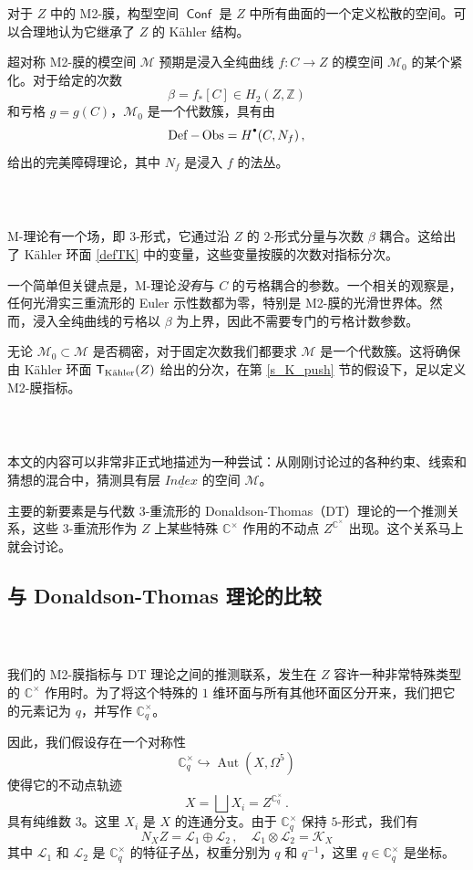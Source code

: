 \documentclass[12pt]{article}
\newcommand{\C}{\mathbb{C}}
\newcommand{\Z}{\mathbb{Z}}
\newcommand{\cL}{\mathscr{L}}
\newcommand{\cM}{\mathcal{M}}
\DeclareMathOperator{\Aut}{Aut}
\DeclareMathOperator{\Def}{Def}
\DeclareMathOperator{\Obs}{Obs}
\DeclareMathOperator{\Conf}{\mathsf{Conf}}
\newcommand{\Ct}{\mathbb{C}^{\times}}
\newcommand{\Cq}{\Ct_q}
\newcommand{\bT}{\mathsf{T}}
\newcommand{\TK}{\bT_{\textup{K\"ahler}}}
\newcommand{\cK}{\mathscr{K}}
\newcommand{\Hd}{{H}^{\raisebox{0.5mm}{$\scriptscriptstyle \bullet$}}}
\newcommand{\Indx}{\underline{\mathit{Index}}}
\theoremstyle{definition}
\begin{document}
对于 $Z$ 中的 M2-膜，构型空间 $\Conf$ 是 $Z$ 中所有曲面的一个定义松散的空间。可以合理地认为它继承了 $Z$ 的 Kähler 结构。

超对称 M2-膜的模空间 $\cM$ 预期是浸入全纯曲线 $f:C\to Z$ 的模空间 $\cM_0$ 的某个紧化。对于给定的次数
$$
\beta=f_* [C] \in H_2(Z,\Z)
$$
和亏格 $g=g(C)$，$\cM_0$ 是一个代数簇，具有由
$$
\Def - \Obs = \Hd(C,N_f) \,,
$$
给出的完美障碍理论，其中 $N_f$ 是浸入 $f$ 的法丛。

\subsubsection{\ }\label{Mbound}

M-理论有一个场，即 $3$-形式，它通过沿 $Z$ 的 $2$-形式分量与次数 $\beta$ 耦合。这给出了 Kähler 环面 \eqref{defTK} 中的变量，这些变量按膜的次数对指标分次。

一个简单但关键点是，M-理论\emph{没有}与 $C$ 的亏格耦合的参数。一个相关的观察是，任何光滑实三重流形的 Euler 示性数都为零，特别是 M2-膜的光滑世界体。然而，浸入全纯曲线的亏格以 $\beta$ 为上界，因此不需要专门的亏格计数参数。

无论 $\cM_0\subset\cM$ 是否稠密，对于固定次数我们都要求 $\cM$ 是一个代数簇。这将确保由 Kähler 环面 $\TK(Z)$ 给出的分次，在第 \ref{s_K_push} 节的假设下，足以定义 M2-膜指标。

\subsubsection{\ }

本文的内容可以非常非正式地描述为一种尝试：从刚刚讨论过的各种约束、线索和猜想的混合中，猜测具有层 $\Indx$ 的空间 $\cM$。

主要的新要素是与代数 $3$-重流形的 Donaldson-Thomas（DT）理论的一个推测关系，这些 $3$-重流形作为 $Z$ 上某些特殊 $\C^{\times}$ 作用的不动点 $Z^{\C^{\times}}$ 出现。这个关系马上就会讨论。
\subsection{与 Donaldson-Thomas 理论的比较}

\subsubsection{\ }
我们的 M2-膜指标与 DT 理论之间的推测联系，发生在 $Z$ 容许一种非常特殊类型的 $\C^{\times}$ 作用时。为了将这个特殊的 $1$ 维环面与所有其他环面区分开来，我们把它的元素记为 $q$，并写作 $\Cq$。

因此，我们假设存在一个对称性
$$
\Cq \hookrightarrow \Aut(X,\Omega^5)
$$
使得它的不动点轨迹
$$
X = \bigsqcup X_i = Z^{\Cq} \,.
$$
具有纯维数 $3$。这里 $X_i$ 是 $X$ 的连通分支。由于 $\Cq$ 保持 $5$-形式，我们有
\begin{equation}
N_X Z = \cL_1 \oplus \cL_2 \,, \quad \cL_1 \otimes \cL_2 = \cK_X\label{NXZ}
\end{equation}
其中 $\cL_1$ 和 $\cL_2$ 是 $\Cq$ 的特征子丛，权重分别为 $q$ 和 $q^{-1}$，这里 $q\in \Cq$ 是坐标。
\end{document}
